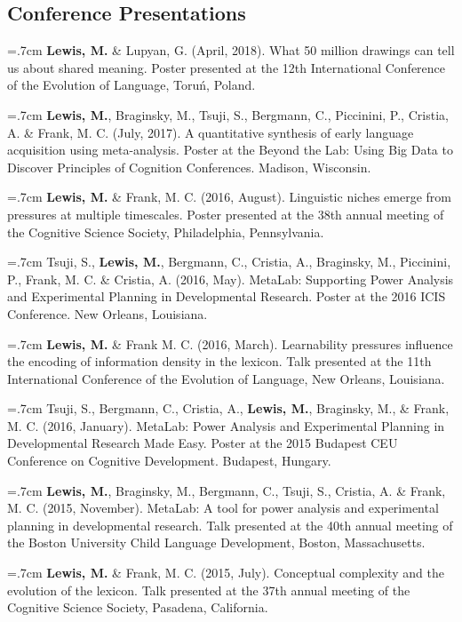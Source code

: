 \documentclass[letterpaper]{article}
\begin{document}
\subsection*{Conference Presentations}


 \hangindent=.7cm {\bf Lewis, M.} \& Lupyan, G. (April, 2018). What 50 million drawings can tell us about shared meaning. Poster presented at the 12th International Conference of the Evolution of Language, Toru\'{n}, Poland.

 \hangindent=.7cm {\bf Lewis, M.}, Braginsky, M., Tsuji, S., Bergmann, C., Piccinini, P., Cristia, A. \& Frank, M. C. (July, 2017). A quantitative synthesis of early language acquisition using meta-analysis. Poster at the Beyond the Lab: Using Big Data to Discover Principles of Cognition Conferences. Madison, Wisconsin.

\hangindent=.7cm {\bf Lewis, M.} \& Frank, M. C. (2016, August).  Linguistic niches emerge from pressures at multiple timescales. Poster presented at the 38th annual meeting of the Cognitive Science Society, Philadelphia, Pennsylvania.

 \hangindent=.7cm  Tsuji, S., {\bf Lewis, M.}, Bergmann, C., Cristia, A.,  Braginsky, M.,  Piccinini, P., Frank, M. C. \& Cristia, A. (2016, May). MetaLab: Supporting Power Analysis and Experimental Planning in Developmental Research. Poster at the 2016 ICIS Conference. New Orleans, Louisiana.


  \hangindent=.7cm {\bf Lewis, M.} \& Frank M. C. (2016, March). Learnability pressures influence the encoding of information density in the lexicon. Talk presented at the 11th International Conference of the Evolution of Language, New Orleans, Louisiana.
  
  \hangindent=.7cm  Tsuji, S., Bergmann, C., Cristia, A., {\bf Lewis, M.}, Braginsky, M., \& Frank, M. C. (2016, January). MetaLab: Power Analysis and Experimental Planning in Developmental Research Made Easy. Poster at the 2015 Budapest CEU Conference on Cognitive Development. Budapest, Hungary.


\hangindent=.7cm {\bf Lewis, M.},  Braginsky,  M.,  Bergmann, C., Tsuji, S., Cristia, A. \& Frank, M. C. (2015, November). MetaLab: A tool for power analysis and experimental planning in developmental research. Talk presented at the 40th annual meeting of the Boston University Child Language Development, Boston, Massachusetts.

\hangindent=.7cm {\bf Lewis, M.} \& Frank, M. C. (2015, July). Conceptual complexity and the evolution of the lexicon. Talk presented at the 37th annual meeting of the Cognitive Science Society, Pasadena, California.
\end{document}
